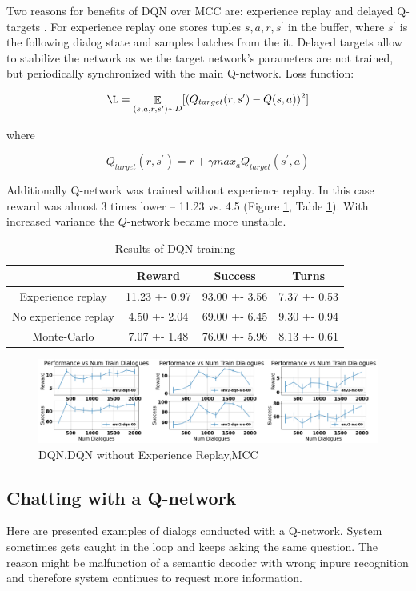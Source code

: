 \documentclass[12pt,titlepage,a4paper]{article}
\DeclareMathOperator*{\E}{\mathbb{E}}
\begin{document}
Two reasons for benefits of DQN over MCC are: experience replay and delayed Q-targets \cite{DQN}. For experience replay one stores tuples ${s, a, r, s^\prime}$ in the buffer, where $s^\prime$ is the following dialog state and samples batches from the it. Delayed targets allow to stabilize the network as we the target network’s parameters are not trained, but periodically synchronized with the main Q-network. Loss function:

\[\L = \E_{(s, a, r, s^\prime) \sim D} [(Q_{target}(r,s^\prime) - Q(s, a))^2]\]

where 

\[Q_{target}(r, s^\prime) = r + \gamma max_{a}Q_{target}(s^\prime,a)\]

Additionally Q-network was trained without experience replay. In this case reward was almost 3 times lower -- 11.23 vs. 4.5 (Figure \ref{fig:ex-no-mc}, Table \ref{tab:replay-no-replay}). With increased variance the $Q$-network became more unstable.
\begin{table}[!h]
    \centering
    \begin{tabular}{||c c c c||} 
     \hline
      & Reward & Success & Turns \\ [0.5ex] 
     \hline\hline
     Experience replay & 11.23 +- 0.97 & 93.00 +- 3.56 & 7.37 +- 0.53 \\ 
     \hline
     No experience replay & 4.50 +- 2.04 & 69.00 +- 6.45 & 9.30 +- 0.94 \\
     \hline
     Monte-Carlo & 7.07 +- 1.48 & 76.00 +- 5.96 & 8.13 +- 0.61 \\
     \hline
    \end{tabular}
    \caption{Results of DQN training}
    \label{tab:replay-no-replay}
\end{table}

\begin{figure}[!htb]
    \centering
    \includegraphics[width=\linewidth]{ex-no-mc.png}
    \caption{DQN,\quad DQN without Experience Replay,\quad MCC}
    \label{fig:ex-no-mc}
\end{figure}

\subsection{Chatting with a Q-network}
Here are presented examples of dialogs conducted with a Q-network. System sometimes gets caught in the loop and keeps asking the same question. The reason might be malfunction of a semantic decoder with wrong inpure recognition and therefore system continues to request more information.
\end{document}
